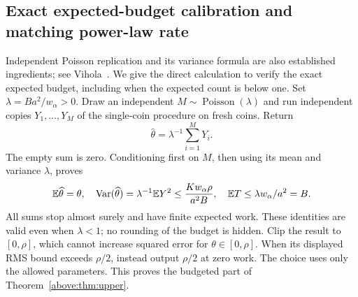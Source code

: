 \subsection{Exact expected-budget calibration and matching power-law rate}
Independent Poisson replication and its variance formula are also established
ingredients; see Vihola~\cite[Example 8]{vihola}. We give the direct calculation
to verify the exact expected budget, including when the expected count is below one.
Set $\lambda=Ba^2/w_\alpha>0$. Draw an independent
$M\sim\operatorname{Poisson}(\lambda)$ and run independent copies $Y_1,\ldots,Y_M$
of the single-coin procedure on fresh coins. Return
\[
 \widehat\theta=\lambda^{-1}\sum_{i=1}^M Y_i.
\]
The empty sum is zero. Conditioning first on $M$, then using its mean and
variance $\lambda$, proves
\[
 \mathbb E\widehat\theta=\theta,
 \quad \operatorname{Var}(\widehat\theta)=\lambda^{-1}\mathbb E Y^2
            \le\frac{K w_\alpha\rho}{a^2B},
 \quad \mathbb E T\le\lambda w_\alpha/a^2=B.
\]
All sums stop almost surely and have finite expected work. These identities are
valid even when $\lambda<1$; no rounding of the budget is hidden. Clip the result
to $[0,\rho]$, which cannot increase squared error for $\theta\in[0,\rho]$.
When its displayed RMS bound exceeds $\rho/2$, instead output $\rho/2$ at zero
work. The choice uses only the allowed parameters. This proves the budgeted
part of Theorem~\ref{above:thm:upper}.


